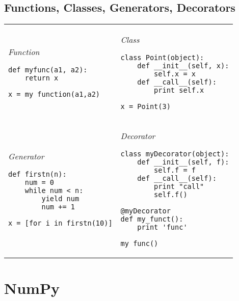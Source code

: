 \documentclass[10pt, a4paper, twocolumn]{article}
\begin{document}
\subsection*{Functions, Classes, Generators, Decorators}
\begin{tabular}{ p{} p{} }
  \begin{minipage}[t]{\columnwidth}
    \textit{Function}
\begin{verbatim}
def myfunc(a1, a2):
    return x

x = my_function(a1,a2)
\end{verbatim}
  \end{minipage}
  &
    \begin{minipage}[t]{\columnwidth}
      \textit{Class}
\begin{verbatim}
class Point(object):
    def __init__(self, x):
        self.x = x
    def __call__(self):
        print self.x

x = Point(3)
\end{verbatim}
    \end{minipage}\\
  \rule{0pt}{0.5cm}

  \begin{minipage}[t]{\columnwidth}
    \textit{Generator}
\begin{verbatim}
def firstn(n):
    num = 0
    while num < n:
        yield num
        num += 1

x = [for i in firstn(10)]
\end{verbatim}
  \end{minipage}
  &
    \begin{minipage}[t]{\columnwidth}
      \textit{Decorator}
\begin{verbatim}
class myDecorator(object):
    def __init__(self, f):
        self.f = f
    def __call__(self):
        print "call"
        self.f()

@myDecorator
def my_funct():
    print 'func'

my_func()
\end{verbatim}
    \end{minipage}
\end{tabular}


\section*{NumPy}
\end{document}
